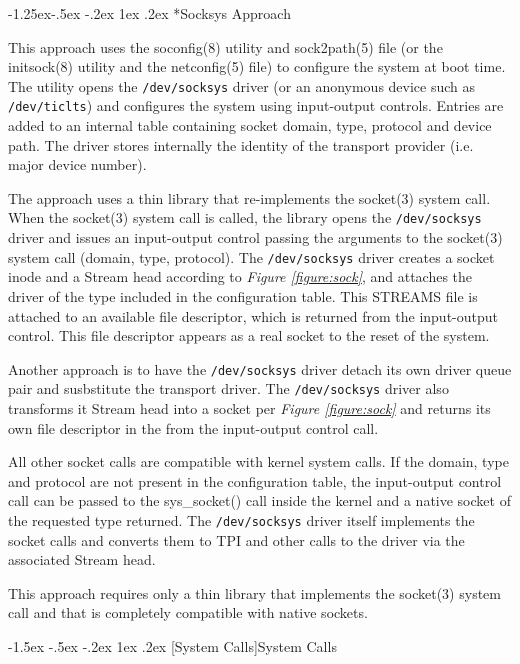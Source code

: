 \documentclass[letterpaper,final,notitlepage,twocolumn,10pt,twoside]{article}
\makeatletter
\renewcommand\subsection{\@startsection{subsection}{2}{\z@}%
                                     {-1.5ex \@plus -.5ex \@minus -.2ex}%
                                     {1ex \@plus .2ex}%
                                     {\normalfont\normalsize\bfseries}}
\renewcommand\subsubsection{\@startsection{subsubsection}{3}{\z@}%
                                     {-1.25ex\@plus -.5ex \@minus -.2ex}%
                                     {1ex \@plus .2ex}%
                                     {\normalfont\normalsize\bfseries}}
\makeatother
\begin{document}
\subsubsection*{Socksys Approach}

This approach uses the soconfig(8) utility and sock2path(5) file (or the
initsock(8) utility and the netconfig(5) file) to configure the system at boot
time.  The utility opens the \texttt{/dev/socksys} driver (or an anonymous
device such as \texttt{/dev/ticlts}) and configures the system using
input-output controls.  Entries are added to an internal table containing
socket domain, type, protocol and device path.  The driver stores internally
the identity of the transport provider (i.e. major device number).

The approach uses a thin library that re-implements the socket(3) system call.
When the socket(3) system call is called, the library opens the
\texttt{/dev/socksys} driver and issues an input-output control passing the
arguments to the socket(3) system call (domain, type, protocol).  The
\texttt{/dev/socksys} driver creates a socket inode and a Stream head
according to \textit{Figure \ref{figure:sock}}, and attaches the driver of the
type included in the configuration table.  This STREAMS file is attached to an
available file descriptor, which is returned from the input-output control.
This file descriptor appears as a real socket to the reset of the system.

Another approach is to have the \texttt{/dev/socksys} driver detach its own
driver queue pair and susbstitute the transport driver.  The
\texttt{/dev/socksys} driver also transforms it Stream head into a socket per
\textit{Figure \ref{figure:sock}} and returns its own file descriptor in
the from the input-output control call.

All other socket calls are compatible with kernel system calls.  If the
domain, type and protocol are not present in the configuration table, the
input-output control call can be passed to the sys\_socket() call inside the
kernel and a native socket of the requested type returned.  The
\texttt{/dev/socksys} driver itself implements the socket calls and converts
them to TPI and other calls to the driver via the associated Stream head.

This approach requires only a thin library that implements the socket(3)
system call and that is completely compatible with native sockets.

\subsection[System Calls]{System Calls}
\end{document}
